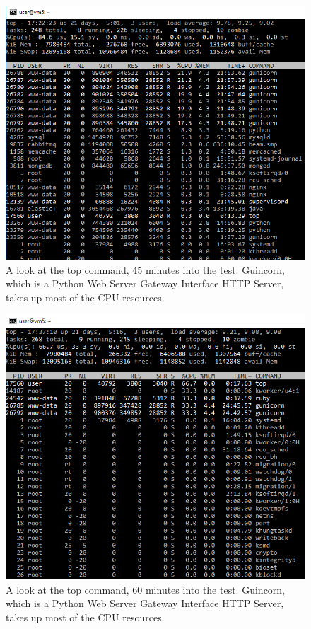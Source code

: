 \documentclass[12pt]{report}
\begin{document}
\begin{figure}[h!]
	\centering
	\includegraphics[width=\textwidth,height=\textheight,keepaspectratio]{intro/S3.png}
	\caption{A look at the top command, 45 minutes into the test. Guincorn, which is a Python Web Server Gateway Interface HTTP Server, takes up most of the CPU resources.}
\end{figure}

\begin{figure}[h!]
	\centering
	\includegraphics[width=\textwidth,height=\textheight,keepaspectratio]{intro/S4.png}
	\caption{A look at the top command, 60 minutes into the test. Guincorn, which is a Python Web Server Gateway Interface HTTP Server, takes up most of the CPU resources.}
\end{figure}
\clearpage
\end{document}
